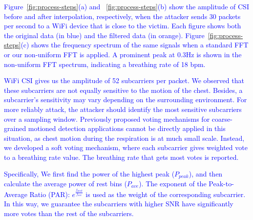 \textcolor{blue}{Figure~\ref {fig:process-steps}(a) and ~\ref{fig:process-steps}(b) show the amplitude of CSI before and after interpolation, respectively, when the attacker sends 30 packets per second to a WiFi device that is close to the victim. Each figure shows both the original data (in blue) and the filtered data (in orange). Figure~\ref{fig:process-steps}(c) shows the frequency spectrum of the same signals when a standard FFT or our non-uniform FFT is applied. A prominent peak at 0.3Hz is shown in the non-uniform FFT spectrum, indicating a breathing rate of 18 bpm.}

\textcolor{blue}{WiFi CSI gives us the amplitude of 52 subcarriers per packet. We observed that these subcarriers are not equally sensitive to the motion of the chest. Besides, a subcarrier's sensitivity may vary depending on the surrounding environment. For more reliably attack, the attacker should identify the most sensitive subcarriers over a sampling window. Previously proposed voting mechanisms for coarse-grained motioned detection applications \cite{alexa,  Wi-chase,MoSense,WiGest} cannot be directly applied in this situation, as chest motion during the respiration is at much small scale. Instead, we developed a soft voting mechanism, where each subcarrier gives weighted vote to a breathing rate value. The breathing rate that gets most votes is reported. }

\textcolor{blue}{Specifically, We first find the power of the highest peak ($P_{peak}$), and then calculate the average power of rest bins ($P_{ave}$). The exponent of the Peak-to-Average Ratio (PAR): $e^{\frac{f_{peak}}{f_{ave}}}$ is used as the weight of the corresponding subcarrier. In this way, we guarantee the subcarriers with higher SNR have significantly more votes than the rest of the subcarriers. }

